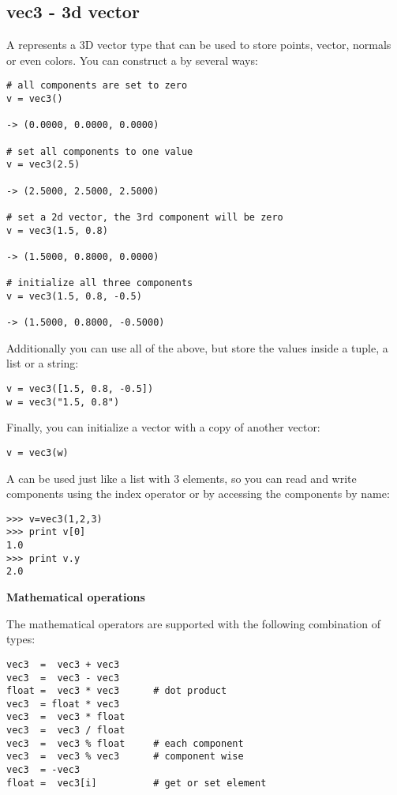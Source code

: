 \subsection{vec3 - 3d vector}
\label{vec3}

A  represents a 3D vector type that can be used to store
points, vector, normals or even colors. You can construct a
 by several ways:

\begin{verbatim}
# all components are set to zero
v = vec3()

-> (0.0000, 0.0000, 0.0000)

# set all components to one value
v = vec3(2.5)

-> (2.5000, 2.5000, 2.5000)

# set a 2d vector, the 3rd component will be zero
v = vec3(1.5, 0.8)

-> (1.5000, 0.8000, 0.0000)

# initialize all three components
v = vec3(1.5, 0.8, -0.5)

-> (1.5000, 0.8000, -0.5000)
\end{verbatim}

Additionally you can use all of the above, but store the values inside
a tuple, a list or a string:

\begin{verbatim}
v = vec3([1.5, 0.8, -0.5])
w = vec3("1.5, 0.8")
\end{verbatim}

Finally, you can initialize a vector with a copy of another vector:

\begin{verbatim}
v = vec3(w)
\end{verbatim}

A  can be used just like a list with 3 elements, so you
can read and write components using the index operator or by accessing
the components by name:

\begin{verbatim}
>>> v=vec3(1,2,3)
>>> print v[0]
1.0
>>> print v.y
2.0
\end{verbatim}

{\bf Mathematical operations}

The mathematical operators are supported with the following
combination of types:

\begin{verbatim}
vec3  =  vec3 + vec3
vec3  =  vec3 - vec3
float =  vec3 * vec3      # dot product
vec3  = float * vec3
vec3  =  vec3 * float
vec3  =  vec3 / float
vec3  =  vec3 % float     # each component
vec3  =  vec3 % vec3      # component wise
vec3  = -vec3
float =  vec3[i]          # get or set element
\end{verbatim}


